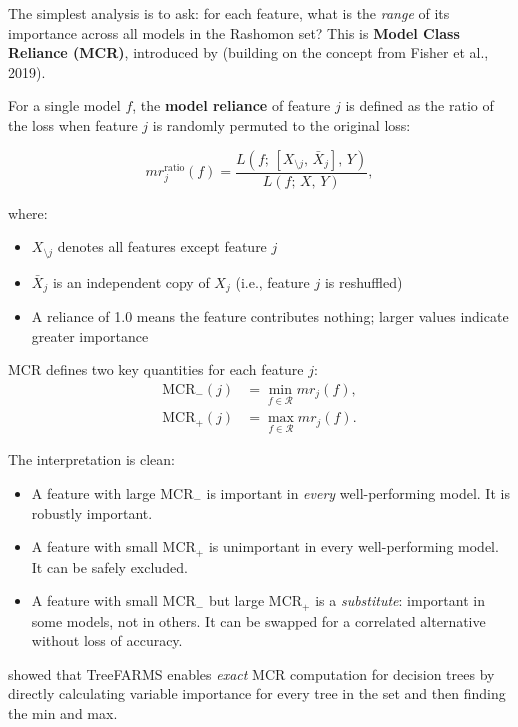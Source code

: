The simplest analysis is to ask: for each feature, what is the \emph{range}
of its importance across all models in the Rashomon set?  This is
\textbf{Model Class Reliance (MCR)}, introduced by \citet{DongRudin2020}
(building on the concept from Fisher et al., 2019).

For a single model $f$, the \textbf{model reliance} of feature $j$ is
defined as the ratio of the loss when feature $j$ is randomly permuted to
the original loss:

\begin{equation}\label{eq:model-reliance}
  mr_j^{\text{ratio}}(f) = \frac{L(f;\,[X_{\setminus j},\, \bar{X}_j],\, Y)}
    {L(f;\, X,\, Y)},
\end{equation}

\noindent where:
\begin{itemize}[leftmargin=1.8em]
  \item $X_{\setminus j}$ denotes all features except feature $j$
  \item $\bar{X}_j$ is an independent copy of $X_j$ (i.e., feature $j$ is
    reshuffled)
  \item A reliance of 1.0 means the feature contributes nothing; larger
    values indicate greater importance
\end{itemize}

MCR defines two key quantities for each feature $j$:
\begin{align}
  \text{MCR}_{-}(j) &= \min_{f \in \mathcal{R}} mr_j(f), \label{eq:mcr-min}\\
  \text{MCR}_{+}(j) &= \max_{f \in \mathcal{R}} mr_j(f). \label{eq:mcr-max}
\end{align}

The interpretation is clean:
\begin{itemize}[leftmargin=1.8em]
  \item A feature with large $\text{MCR}_{-}$ is important in \emph{every}
    well-performing model.  It is robustly important.
  \item A feature with small $\text{MCR}_{+}$ is unimportant in every
    well-performing model.  It can be safely excluded.
  \item A feature with small $\text{MCR}_{-}$ but large $\text{MCR}_{+}$ is
    a \emph{substitute}: important in some models, not in others.  It can
    be swapped for a correlated alternative without loss of accuracy.
\end{itemize}

\citet{XinEtAl2022} showed that TreeFARMS enables \emph{exact} MCR
computation for decision trees by directly calculating variable importance
for every tree in the set and then finding the min and max.

